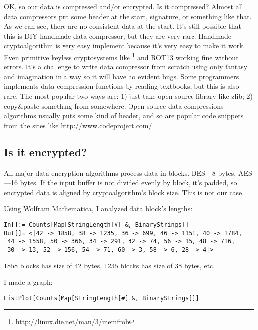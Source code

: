OK, so our data is compressed and/or encrypted.
Is it compressed? Almost all data compressors put some header at the start, signature, or something like that.
As we can see, there are no consistent data at the start.
It's still possible that this is DIY handmade data compressor, but they are very rare.
Handmade cryptoalgorithm is very easy implement because it's very easy to make it work.
Even primitive keyless cryptosystems like \footnote{\url{http://linux.die.net/man/3/memfrob}}
and ROT13 working fine without errors.
It's a challenge to write data compressor from scratch using only fantasy and imagination in a way so it will have no evident bugs.
Some programmers implements data compression functions by reading textbooks, but this is also rare.
The most popular two ways are:
1) just take open-source library like zlib;
2) copy\&paste something from somewhere.
Open-source data compressions algorithms usually puts some kind of header, and so
are popular code snippets from the sites like \url{http://www.codeproject.com/}.

\subsection{Is it encrypted?}

All major data encryption algorithms process data in blocks. DES---8 bytes, AES---16 bytes.
If the input buffer is not divided evenly by block, it's padded, so encrypted data is aligned
by cryptoalgorithm's block size.
This is not our case.

Using Wolfram Mathematica, I analyzed data block's lengths:

\begin{lstlisting}
In[]:= Counts[Map[StringLength[#] &, BinaryStrings]]
Out[]= <|42 -> 1858, 38 -> 1235, 36 -> 699, 46 -> 1151, 40 -> 1784, 
 44 -> 1558, 50 -> 366, 34 -> 291, 32 -> 74, 56 -> 15, 48 -> 716, 
 30 -> 13, 52 -> 156, 54 -> 71, 60 -> 3, 58 -> 6, 28 -> 4|>
\end{lstlisting}

1858 blocks has size of 42 bytes, 1235 blocks has size of 38 bytes, etc.

I made a graph:

\begin{lstlisting}
ListPlot[Counts[Map[StringLength[#] &, BinaryStrings]]]
\end{lstlisting}

\begin{figure}[H]
\centering
{}
\end{figure}

